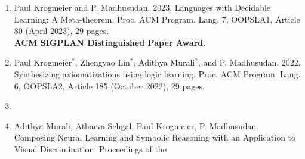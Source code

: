 \documentclass[sigchi,12pt,a4paper,sans,nonacm]{acmart}
\newcommand{\myh}[3][zgreen]{\href{#2}{\color{#1}{#3}}}
\begin{document}
\begin{enumerate}[itemsep=16pt]
\item[] Paul Krogmeier and P. Madhusudan. 2023. Languages with
  Decidable Learning: A Meta-theorem. Proc. ACM Program. Lang. 7,
  OOPSLA1, Article 80 (April 2023), 29
  pages. \myh{https://doi.org/10.1145/3586032}{https://doi.org/10.1145/3586032}
  \\ \textbf{ACM SIGPLAN Distinguished Paper Award.}
\item[] Paul Krogmeier$^*$, Zhengyao Lin$^*$, Adithya Murali$^*$, and
  P. Madhusudan. 2022. Synthesizing axiomatizations using logic
  learning. Proc. ACM Program. Lang. 6, OOPSLA2, Article 185 (October
  2022), 29
  pages. \myh{https://doi.org/10.1145/3563348}{https://doi.org/10.1145/3563348}
\item[]
\item[] Adithya Murali, Atharva Sehgal, Paul Krogmeier,
  P. Madhusudan. Composing Neural Learning and Symbolic Reasoning with
  an Application to Visual Discrimination. Proceedings of the

\end{enumerate}
\end{document}
